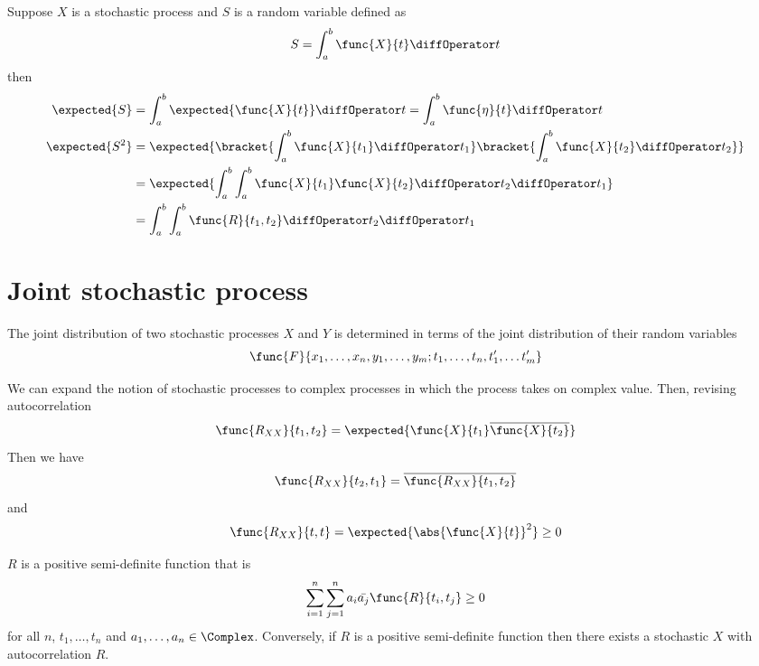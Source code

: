 \begin{example}
    Suppose \(X\) is a stochastic process and \(S\) is a random variable defined as
    \begin{equation*}
        S = \int_{a}^b \func{X}{t} \diffOperator t
    \end{equation*} 
    then 
    \begin{align*}
        \expected{S} &= \int_{a}^b \expected{\func{X}{t}} \diffOperator t = \int_{a}^b \func{\eta}{t} \diffOperator t\\
        \expected{S^2} &= \expected{\bracket{\int_{a}^b \func{X}{t_1} \diffOperator t_1}\bracket{\int_{a}^b \func{X}{t_2} \diffOperator t_2}}\\
        &= \expected{\int_{a}^b \int_{a}^b \func{X}{t_1} \func{X}{t_2} \diffOperator t_2 \diffOperator t_1}\\
        &= \int_{a}^b \int_{a}^b \func{R}{t_1,t_2} \diffOperator t_2 \diffOperator t_1
    \end{align*}
\end{example}


\section{Joint stochastic process}
The joint distribution of two stochastic processes \(X\) and \(Y\) is determined in terms of the joint distribution of their random variables 
\begin{equation*}
    \func{F}{x_1,\dots, x_n, y_1 , \dots , y_m; t_1, \dots , t_n, t'_1, \dots t'_m}
\end{equation*}

We can expand the notion of stochastic processes to complex processes in which the process takes on complex value. Then, revising autocorrelation
\begin{equation*}
    \func{R_{XX}}{t_1,t_2} = \expected{\func{X}{t_1} \overline{\func{X}{t_2}}}
\end{equation*}
Then we have 
\begin{equation*}
    \func{R_{XX}}{t_2, t_1} = \overline{\func{R_{XX}}{t_1,t_2}}
\end{equation*}
and 
\begin{equation*}
    \func{R_{XX}}{t,t} = \expected{\abs{\func{X}{t}}^2} \geq 0
\end{equation*}

\begin{remark}
    \(R\) is a positive semi-definite function that is 
    \begin{equation*}
        \sum_{i = 1}^n \sum_{j = 1}^n a_i \bar{a_j} \func{R}{t_i, t_j} \geq 0
    \end{equation*}
    for all \(n\), \(t_1, \dots , t_n\) and \(a_1 , \dots , a_n \in \Complex\). Conversely, if \(R\) is a positive semi-definite function then there exists a stochastic \(X\) with autocorrelation \(R\).
\end{remark}

